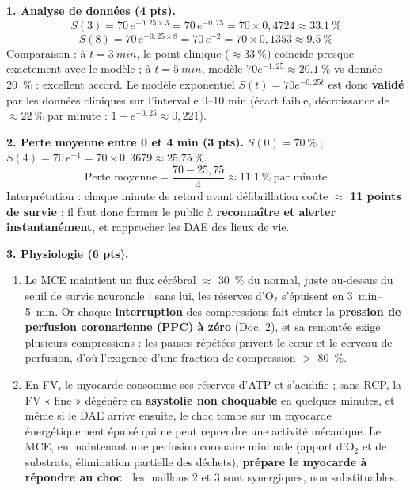 \documentclass[11pt]{article}
\begin{document}
\begin{corrige}
\textbf{1. Analyse de données (4 pts).}
\[ S(3) = 70\,e^{-0{,}25 \times 3} = 70\,e^{-0{,}75} = 70 \times 0{,}4724 \approx \SI{33,1}{\%} \]
\[ S(8) = 70\,e^{-0{,}25 \times 8} = 70\,e^{-2} = 70 \times 0{,}1353 \approx \SI{9,5}{\%} \]
Comparaison : à $t=\SI{3}{min}$, le point clinique ($\approx \SI{33}{\%}$) coïncide presque exactement avec le modèle ; à $t=\SI{5}{min}$, modèle $70e^{-1{,}25} \approx \SI{20,1}{\%}$ vs donnée \SI{20}{\%} : excellent accord. Le modèle exponentiel $S(t)=70e^{-0{,}25t}$ est donc \textbf{validé} par les données cliniques sur l'intervalle 0--10 min (écart faible, décroissance de $\approx \SI{22}{\%}$ par minute : $1-e^{-0{,}25} \approx 0{,}221$).

\textbf{2. Perte moyenne entre 0 et 4 min (3 pts).}
$S(0) = \SI{70}{\%}$ ; $S(4) = 70\,e^{-1} = 70 \times 0{,}3679 \approx \SI{25,75}{\%}$.
\[ \text{Perte moyenne} = \frac{70 - 25{,}75}{4} \approx \SI{11,1}{\%}\ \text{par minute} \]
Interprétation : chaque minute de retard avant défibrillation coûte $\approx$ \textbf{11 points de survie} ; il faut donc former le public à \textbf{reconnaître et alerter instantanément}, et rapprocher les DAE des lieux de vie.

\textbf{3. Physiologie (6 pts).}
\begin{enumerate}
    \item Le MCE maintient un flux cérébral $\approx$ \SI{30}{\%} du normal, juste au-dessus du seuil de survie neuronale ; sans lui, les réserves d'O$_2$ s'épuisent en \SIrange{3}{5}{min}. Or chaque \textbf{interruption} des compressions fait chuter la \textbf{pression de perfusion coronarienne (PPC) à zéro} (Doc. 2), et sa remontée exige plusieurs compressions : les pauses répétées privent le cœur et le cerveau de perfusion, d'où l'exigence d'une fraction de compression $>$ \SI{80}{\%}.
    \item En FV, le myocarde consomme ses réserves d'ATP et s'acidifie ; sans RCP, la FV « fine » dégénère en \textbf{asystolie non choquable} en quelques minutes, et même si le DAE arrive ensuite, le choc tombe sur un myocarde énergétiquement épuisé qui ne peut reprendre une activité mécanique. Le MCE, en maintenant une perfusion coronaire minimale (apport d'O$_2$ et de substrats, élimination partielle des déchets), \textbf{prépare le myocarde à répondre au choc} : les maillons 2 et 3 sont synergiques, non substituables.
\end{enumerate}


\end{corrige}
\end{document}
